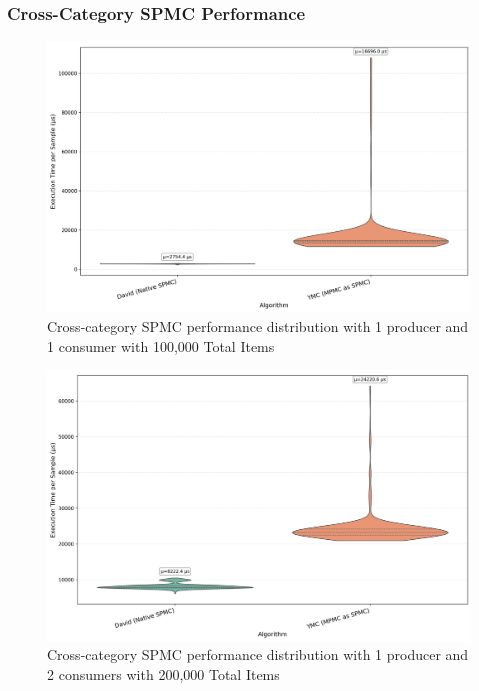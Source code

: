 \subsubsection{Cross-Category SPMC Performance}
\begin{figure}[H]
\centering
\caption{Cross-category SPMC performance distribution with 1 producer and 1 consumer with 100,000 Total Items}
\label{fig:cross-spmc-violin-1c}
\includegraphics[width=\textwidth]{images/results/best_in_spmc_performance_violin_1P1C.png}
\end{figure}

\begin{figure}[H]
\centering
\caption{Cross-category SPMC performance distribution with 1 producer and 2 consumers with 200,000 Total Items}
\label{fig:cross-spmc-violin-2c}
\includegraphics[width=\textwidth]{images/results/best_in_spmc_performance_violin_1P2C.png}
\end{figure}

